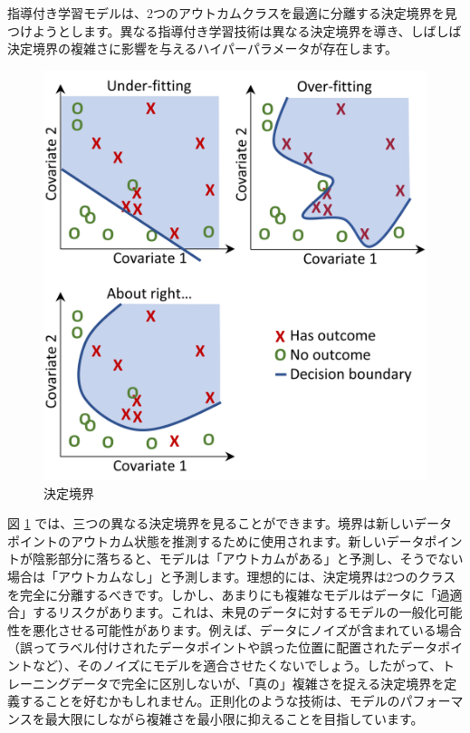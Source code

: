 \documentclass[
  11pt]{book}
\theoremstyle{definition}
\theoremstyle{definition}
\theoremstyle{definition}
\theoremstyle{definition}
\theoremstyle{remark}
\begin{document}
指導付き学習モデルは、2つのアウトカムクラスを最適に分離する決定境界を見つけようとします。異なる指導付き学習技術は異なる決定境界を導き、しばしば決定境界の複雑さに影響を与えるハイパーパラメータが存在します。 

\begin{figure}

{\centering \includegraphics[width=0.8\linewidth]{images/PatientLevelPrediction/decisionBoundary} 

}

\caption{決定境界}\label{fig:decisionBoundary}
\end{figure}

図 \ref{fig:decisionBoundary} では、三つの異なる決定境界を見ることができます。境界は新しいデータポイントのアウトカム状態を推測するために使用されます。新しいデータポイントが陰影部分に落ちると、モデルは「アウトカムがある」と予測し、そうでない場合は「アウトカムなし」と予測します。理想的には、決定境界は2つのクラスを完全に分離するべきです。しかし、あまりにも複雑なモデルはデータに「過適合」するリスクがあります。これは、未見のデータに対するモデルの一般化可能性を悪化させる可能性があります。例えば、データにノイズが含まれている場合（誤ってラベル付けされたデータポイントや誤った位置に配置されたデータポイントなど）、そのノイズにモデルを適合させたくないでしょう。したがって、トレーニングデータで完全に区別しないが、「真の」複雑さを捉える決定境界を定義することを好むかもしれません。正則化のような技術は、モデルのパフォーマンスを最大限にしながら複雑さを最小限に抑えることを目指しています。
\end{document}
